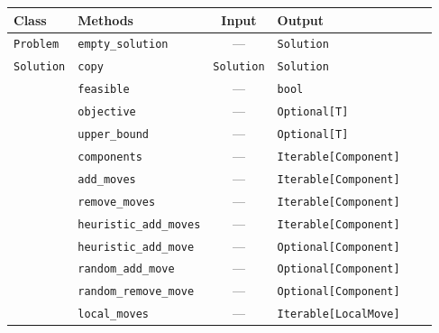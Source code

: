 \renewcommand{\arraystretch}{1.5}
\begin{adjustbox}{max width=\textwidth}
  \begin{tabular}{@{}llcp{4cm}cp{4cm}@{}}
    \toprule
    \textbf{Class}                      & \textbf{Methods}                         & \textbf{Input}     & \textbf{Output}              \\
    \midrule
    \multirow{1}{*}{\texttt{Problem}}   & \texttt{empty\_solution}                 & ---                & \texttt{Solution}            \\
    \midrule
    \multirow{23}{*}{\texttt{Solution}} & \texttt{copy}                            & \texttt{Solution}  & \texttt{Solution}            \\
                                        & \texttt{feasible}                        & ---                & \texttt{bool}                \\
                                        & \texttt{objective}                       & ---                & \texttt{Optional[T]}         \\
                                        & \texttt{upper\_bound}                    & ---                & \texttt{Optional[T]}         \\
                                        & \texttt{components}                      & ---                & \texttt{Iterable[Component]} \\
                                        & \texttt{add\_moves}                      & ---                & \texttt{Iterable[Component]} \\
                                        & \texttt{remove\_moves}                   & ---                & \texttt{Iterable[Component]} \\
                                        & \texttt{heuristic\_add\_moves}           & ---                & \texttt{Iterable[Component]} \\
                                        & \texttt{heuristic\_add\_move}            & ---                & \texttt{Optional[Component]} \\
                                        & \texttt{random\_add\_move}               & ---                & \texttt{Optional[Component]} \\
                                        & \texttt{random\_remove\_move}            & ---                & \texttt{Optional[Component]} \\
                                        & \texttt{local\_moves}                    & ---                & \texttt{Iterable[LocalMove]} \\

\end{tabular}
\end{adjustbox}
